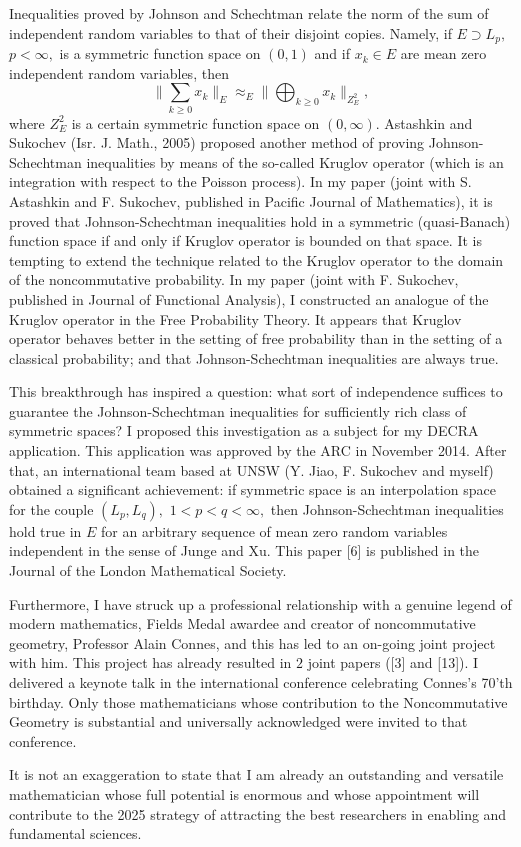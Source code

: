 \documentclass[a4paper]{amsart}
\begin{document}
Inequalities proved by Johnson and Schechtman relate the norm of the sum of independent random variables to that of their disjoint copies. Namely, if $E\supset L_p,$ $p<\infty,$ is a symmetric function space on $(0,1)$ and if $x_k\in E$ are mean zero independent random variables, then
$$\|\sum_{k\geq0}x_k\|_E\approx_E\|\bigoplus_{k\geq0}x_k\|_{Z_E^2},$$
where $Z_E^2$ is a certain symmetric function space on $(0,\infty).$ Astashkin and Sukochev (Isr. J. Math., 2005) proposed another method of proving Johnson-Schechtman inequalities by means of the so-called Kruglov operator (which is an integration with respect to the Poisson process). In my paper (joint with S. Astashkin and F. Sukochev, published in Pacific Journal of Mathematics), it is proved that Johnson-Schechtman inequalities hold in a symmetric (quasi-Banach) function space if and only if Kruglov operator is bounded on that space. It is tempting to extend the technique related to the Kruglov operator to the domain of the noncommutative probability. In my paper (joint with F. Sukochev, published in Journal of Functional Analysis), I constructed an analogue of the Kruglov operator in the Free Probability Theory. It appears that Kruglov operator behaves better in the setting of free probability than in the setting of a classical probability; and that Johnson-Schechtman inequalities are always true.

This breakthrough has inspired a question: what sort of independence suffices to guarantee the Johnson-Schechtman inequalities for sufficiently rich class of symmetric spaces?  I proposed this investigation as a subject for my DECRA application. This application was approved by the ARC in November 2014. After that, an international team based at UNSW (Y. Jiao, F. Sukochev and myself) obtained a significant achievement: if symmetric space is an interpolation space for the couple $(L_p,L_q),$ $1<p<q<\infty,$ then Johnson-Schechtman inequalities hold true in $E$ for an arbitrary sequence of mean zero random variables independent in the sense of Junge and Xu. This paper [6] is published in the Journal of the London Mathematical Society.

Furthermore, I have struck up a professional relationship with a genuine legend of modern mathematics, Fields Medal awardee and creator of noncommutative geometry, Professor Alain Connes, and this has led to an on-going joint project with him. This project has already resulted in $2$ joint papers ([3] and [13]). I delivered a keynote talk in the international conference celebrating Connes's 70'th birthday. Only those mathematicians whose contribution to the Noncommutative Geometry is substantial and universally acknowledged were invited to that conference.

It is not an exaggeration to state that I am already an outstanding and versatile mathematician whose full potential is enormous and whose appointment will contribute to the 2025 strategy of attracting the best researchers in enabling and fundamental sciences.
\end{document}
